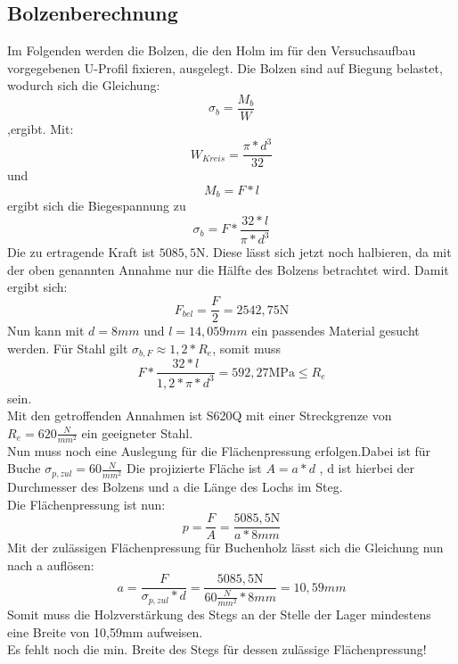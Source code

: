 

\subsection{Bolzenberechnung}
Im Folgenden werden die Bolzen, die den Holm im für den Versuchsaufbau vorgegebenen U-Profil fixieren, ausgelegt. Die Bolzen sind auf Biegung belastet, wodurch sich die Gleichung:
\begin{equation}
	\sigma_{b}=\frac{M_{b}}{W} 
\end{equation}
,ergibt.
 Mit: 
 \begin{equation}
 	W_{Kreis}=\frac{\pi*d^{3}}{32}
 \end{equation}
 und 
 \begin{equation}
 	M_{b}=F*l
 \end{equation}
 ergibt sich die Biegespannung zu
 \begin{equation}
 	\sigma_{b}=F*\frac{32*l}{\pi*d^{3}}
 \end{equation}
Die zu ertragende Kraft ist $5085,5 \mathrm{N}$. Diese lässt sich jetzt noch halbieren, da mit der oben genannten Annahme nur die Hälfte des Bolzens betrachtet wird. Damit ergibt sich:
 \begin{equation}
 	F_{bel}=\frac{F}{2} =2542,75 \mathrm{N}
 \end{equation}
 Nun kann mit $d=8mm$ und $l=14,059mm$ ein passendes Material gesucht werden. Für Stahl gilt $\sigma_{b,F}\approx1,2*R_{e}$, somit muss 
 \begin{equation}
 	F*\frac{32*l}{1,2*\pi*d^{3}}=592,27\mathrm{MPa}\leq
R_{e} \end{equation}  sein.\\

 Mit den getroffenden Annahmen ist S620Q mit einer Streckgrenze von $R_{e}=620\frac{N}{mm^{2}}$ ein geeigneter Stahl.\\
 
 \noindent Nun muss noch eine Auslegung für die Flächenpressung erfolgen.Dabei ist für Buche $\sigma_{p,zul}=60\frac{N}{mm^2}$
Die projizierte Fläche ist $A=a*d$ , d ist hierbei der Durchmesser des Bolzens und a die Länge des Lochs im Steg.\\
Die Flächenpressung ist nun: 
\begin{equation}
	p=\frac{F}{A}=\frac{5085,5\mathrm{N}}{a*8mm}
\end{equation}
Mit der zulässigen Flächenpressung für Buchenholz lässt sich die Gleichung nun nach a auflösen:
\begin{equation}
	a=\frac{F}{\sigma_{p,zul}*d}=\frac{5085,5\mathrm{N}}{60\frac{N}{mm^{2}}*8mm}=10,59mm
\end{equation}
Somit muss die Holzverstärkung des Stegs an der Stelle der Lager mindestens eine Breite von 10,59$\mathrm{mm}$ aufweisen.\cite{item6}\\

\noindent Es fehlt noch die min. Breite des Stegs für dessen zulässige Flächenpressung!
 
 
 
 
  
 
